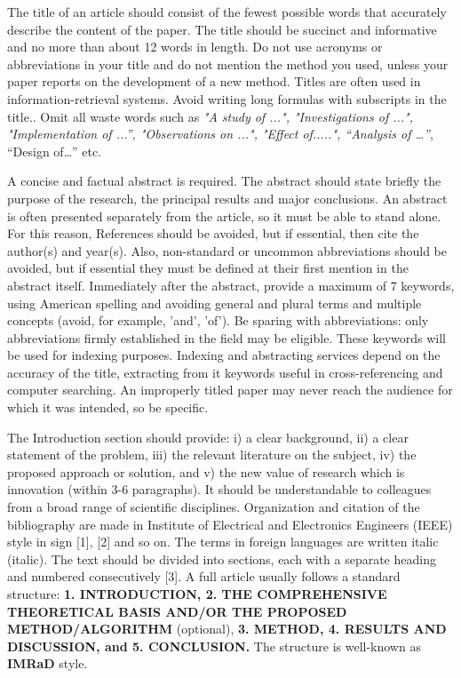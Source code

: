 \documentclass{iaesarticle}
\begin{document}
The title of an article should consist of the fewest possible words that accurately describe the content of the paper. The title should be succinct and informative and no more than about 12 words in length. Do not use acronyms or abbreviations in your title and do not mention the method you used, unless your paper reports on the development of a new method. Titles are often used in information-retrieval systems. Avoid writing long formulas with  subscripts in the title.. Omit all waste words such as \textit{"A study of ...", "Investigations of ...", "Implementation of ...”, "Observations on ...", "Effect of.....", “Analysis of …”}, “Design of…” etc. 

A concise and factual abstract is required. The abstract should state briefly the purpose of the research, the principal results and major conclusions. An abstract is often presented separately from the article, so it must be able to stand alone. For this reason, References should be avoided, but if essential, then cite the author(s) and year(s). Also, non-standard or uncommon abbreviations should be avoided, but if essential they must be defined at their first mention in the abstract itself. Immediately after the abstract, provide a maximum of 7 keywords, using American spelling and avoiding general and plural terms and multiple concepts (avoid, for example, 'and', 'of'). Be sparing with abbreviations: only abbreviations firmly established in the field may be eligible. These keywords will be used for indexing purposes. Indexing and abstracting services depend on the accuracy of the title, extracting from it keywords useful in cross-referencing and computer searching. An improperly titled paper may never reach the audience for which it was intended, so be specific. 

The Introduction section should provide: i) a clear background, ii) a clear statement of the problem, iii) the relevant literature on the subject, iv) the proposed approach or solution, and v) the new value of research which is innovation (within 3-6 paragraphs). It should be understandable to colleagues from a broad range of scientific disciplines. Organization and citation of the bibliography are made in Institute of Electrical and Electronics Engineers (IEEE) style in sign [1], [2] and so on. The terms in foreign languages are written italic (italic). The text should be divided into sections, each with a separate heading and numbered consecutively [3]. A full article usually follows a standard structure: \textbf{1. INTRODUCTION, 2. THE COMPREHENSIVE THEORETICAL BASIS AND/OR THE PROPOSED METHOD/ALGORITHM} (optional), \textbf{3. METHOD, 4. RESULTS AND DISCUSSION, and 5. CONCLUSION.} The structure is well-known as \textbf{IMRaD} style.
\end{document}
